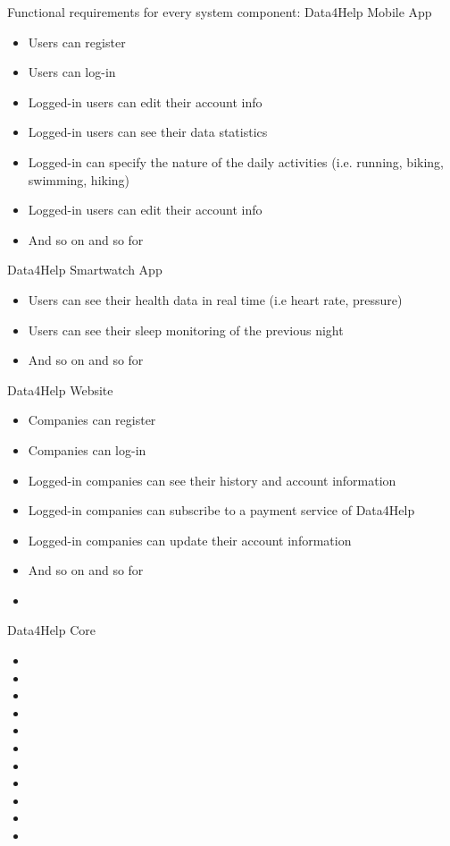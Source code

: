 Functional requirements for every system component:
\newline
Data4Help Mobile App
\begin{itemize}
    \item Users can register
    \item Users can log-in
    \item Logged-in users can edit their account info
    \item Logged-in users can see their data statistics
    \item Logged-in can specify the nature of the daily activities (i.e. running, biking, swimming, hiking)
    \item Logged-in users can edit their account info
    \item And so on and so for
\end{itemize}

\noindent Data4Help Smartwatch App
\begin{itemize}
    \item Users can see their health data in real time (i.e heart rate, pressure)
    \item Users can see their sleep monitoring of the previous night
    \item And so on and so for
\end{itemize}

\noindent Data4Help Website
\begin{itemize}
    \item Companies can register
    \item Companies can log-in
    \item Logged-in companies can see their history and account information
    \item Logged-in companies can subscribe to a payment service of Data4Help
    \item Logged-in companies can update their account information
    \item And so on and so for
    \item 
\end{itemize}

\noindent Data4Help Core
\begin{itemize}
    \item 
    \item 
    \item 
    \item
    \item 
    \item 
    \item 
    \item 
    \item 
    \item 
    \item 
\end{itemize}
